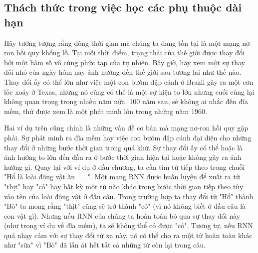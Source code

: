 

\subsection{Thách thức trong việc học các phụ thuộc dài hạn}

Hãy tưởng tượng rằng dòng thời gian mà chúng ta đang tồn tại là một mạng nơ-ron hồi quy khổng lồ. Tại mỗi thời điểm, trạng thái của thế giới được thay đổi bởi một hàm số vô cùng phức tạp của tự nhiên. Bây giờ, hãy xem một sự thay đổi nhỏ của ngày hôm nay ảnh hưởng đến thế giới sau tương lai như thế nào. Thay đổi ấy có thể lớn như việc một con bướm đập cánh ở Brazil gây ra một cơn lốc xoáy ở Texas, nhưng nó cũng có thể là một sự kiện to lớn nhưng cuối cùng lại không quan trọng trong nhiều năm nữa. 100 năm sau, sẽ không ai nhắc đến đĩa mềm, thứ được xem là một phát minh lớn trong những năm 1960.

Hai ví dụ trên cũng chính là những vấn đề cơ bản mà mạng nơ-ron hồi quy gặp phải. Sự phát minh ra đĩa mềm hay việc con bướm đập cánh đại diện cho những thay đổi ở những bước thời gian trong quá khứ. Sự thay đổi ấy có thể hoặc là ảnh hưởng to lớn đến đầu ra ở bước thời gian hiện tại hoặc không gây ra ảnh hưởng gì. Quay lại với ví dụ ở đầu chương, ta cần tìm từ tiếp theo trong chuỗi "Hổ là loài động vật ăn \_\_". Một mạng RNN được huấn luyện để xuất ra từ "thịt" hay "cỏ" hay bất kỳ một từ nào khác trong bước thời gian tiếp theo tùy vào tên của loài động vật ở đầu câu. Trong trường hợp ta thay đổi từ "Hổ" thành "Bò" ta mong rằng "thịt" cũng sẽ trở thành "cỏ" (vì nó không biết ở đầu câu là con vật gì). Nhưng nếu RNN của chúng ta hoàn toàn bỏ qua sự thay đổi này (như trong ví dụ về đĩa mềm), ta sẽ không thể có được "cỏ". Tương tự, nếu RNN quá nhạy cảm với sự thay đổi từ xa này, nó có thể cho ra một từ hoàn toàn khác như "sữa" vì "Bò" đã lấn át hết tất cả những từ còn lại trong câu.

